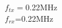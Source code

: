 \documentclass[preview]{standalone}
\begin{document}
\begin{center}
$f_{tx}=$0.22MHz\\$f_{rx}$=0.22MHz
\end{center}
\end{document}
